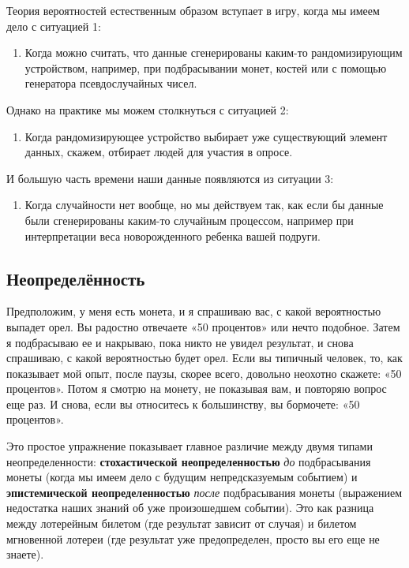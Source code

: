 \documentclass[11pt,a4paper]{article}
\providecommand{\tightlist}{%
      \setlength{\itemsep}{0pt}\setlength{\parskip}{0pt}}
\begin{document}
    Теория вероятностей естественным образом вступает в игру, когда мы имеем
дело с ситуацией 1:

\begin{enumerate}
\def\labelenumi{\arabic{enumi}.}
\tightlist
\item
  Когда можно считать, что данные сгенерированы каким-то рандомизирующим
  устройством, например, при подбрасывании монет, костей или с помощью
  генератора псевдослучайных чисел.
\end{enumerate}

Однако на практике мы можем столкнуться с ситуацией 2:

\begin{enumerate}
\def\labelenumi{\arabic{enumi}.}
\setcounter{enumi}{1}
\tightlist
\item
  Когда рандомизирующее устройство выбирает уже существующий элемент
  данных, скажем, отбирает людей для участия в опросе.
\end{enumerate}

И большую часть времени наши данные появляются из ситуации 3:

\begin{enumerate}
\def\labelenumi{\arabic{enumi}.}
\setcounter{enumi}{2}
\tightlist
\item
  Когда случайности нет вообще, но мы действуем так, как если бы данные
  были сгенерированы каким-то случайным процессом, например при
  интерпретации веса новорожденного ребенка вашей подруги.
\end{enumerate}


\subsection{Неопределённость}

Предположим, у меня есть монета, и я спрашиваю вас, с какой вероятностью
выпадет орел. Вы радостно отвечаете «50 процентов» или нечто подобное.
Затем я подбрасываю ее и накрываю, пока никто не увидел результат, и
снова спрашиваю, с какой вероятностью будет орел. Если вы типичный
человек, то, как показывает мой опыт, после паузы, скорее всего,
довольно неохотно скажете: «50 процентов». Потом я смотрю на монету, не
показывая вам, и повторяю вопрос еще раз. И снова, если вы относитесь к
большинству, вы бормочете: «50 процентов».

Это простое упражнение показывает главное различие между двумя типами
неопределенности: \textbf{стохастической неопределенностью} \emph{до}
подбрасывания монеты (когда мы имеем дело с будущим непредсказуемым
событием) и \textbf{эпистемической неопределенностью} \emph{после}
подбрасывания монеты (выражением недостатка наших знаний об уже
произошедшем событии). Это как разница между лотерейным билетом (где
результат зависит от случая) и билетом мгновенной лотереи (где результат
уже предопределен, просто вы его еще не знаете).
\end{document}
